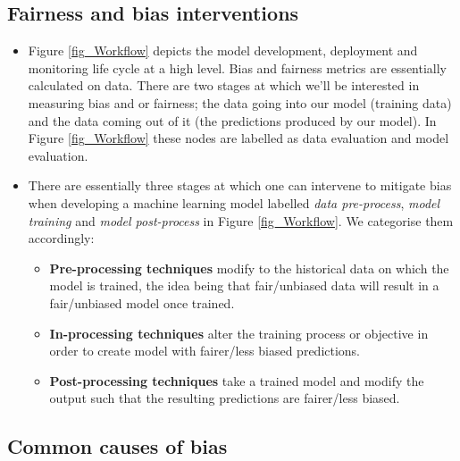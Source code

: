 \subsection*{Fairness and bias interventions}

\begin{itemize}[leftmargin=*]
%
\item Figure \ref{fig_Workflow} depicts the model development, deployment and monitoring life cycle at a high level. Bias and fairness metrics are essentially calculated on data. There are two stages at which we’ll be interested in measuring bias and or fairness; the data going into our model (training data) and the data coming out of it (the predictions produced by our model). In Figure \ref{fig_Workflow} these nodes are labelled as data evaluation and model evaluation.
%
\item There are essentially three stages at which one can intervene to mitigate bias when developing a machine learning model  labelled \emph{data pre-process}, \emph{model training} and \emph{model post-process} in Figure \ref{fig_Workflow}. We categorise them accordingly:
%
\begin{itemize}[label=\hexagon]
%
\item \textbf{Pre-processing techniques} modify to the historical data on which the model is trained, the idea being that fair/unbiased data will result in a fair/unbiased model once trained.
%
\item \textbf{In-processing techniques} alter the training process or objective in order to create model with fairer/less biased predictions.
%
\item \textbf{Post-processing techniques} take a trained model and modify the output such that the resulting predictions are fairer/less biased.
%
\end{itemize}
%
\end{itemize}

\subsection*{Common causes of bias}

